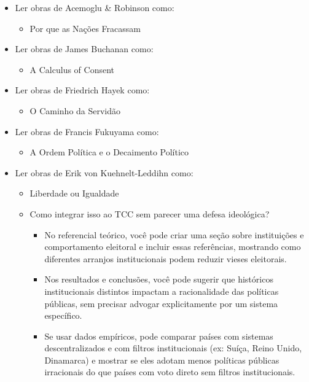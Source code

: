 \documentclass[
	article,
	12pt,
	oneside,
	a4paper,
	english,
	brazil,
	sumario=tradicional
]{abntex2}
\begin{document}
\begin{itemize}
\begin{itemize}
  \end{itemize}
  \item Ler obras de Acemoglu \& Robinson como: \begin{itemize}
    \item Por que as Nações Fracassam
  \end{itemize}
  \item Ler obras de James Buchanan como: \begin{itemize}
    \item A Calculus of Consent
  \end{itemize}
  \item Ler obras de Friedrich Hayek como: \begin{itemize}
    \item O Caminho da Servidão
  \end{itemize}
  \item Ler obras de Francis Fukuyama como: \begin{itemize}
    \item A Ordem Política e o Decaimento Político
  \end{itemize}
  \item Ler obras de Erik von Kuehnelt-Leddihn como: \begin{itemize}
    \item Liberdade ou Igualdade
    \item Como integrar isso ao TCC sem parecer uma defesa ideológica?
      \begin{itemize}
        \item No referencial teórico, você pode criar uma seção sobre instituições e comportamento eleitoral e incluir essas referências, mostrando como diferentes arranjos institucionais podem reduzir vieses eleitorais.
        \item Nos resultados e conclusões, você pode sugerir que históricos institucionais distintos impactam a racionalidade das políticas públicas, sem precisar advogar explicitamente por um sistema específico.
        \item Se usar dados empíricos, pode comparar países com sistemas descentralizados e com filtros institucionais (ex: Suíça, Reino Unido, Dinamarca) e mostrar se eles adotam menos políticas públicas irracionais do que países com voto direto sem filtros institucionais.
      \end{itemize}
  \end{itemize}
\end{itemize}
\newpage

\renewcommand{\refname}{Referências}


\end{document}
